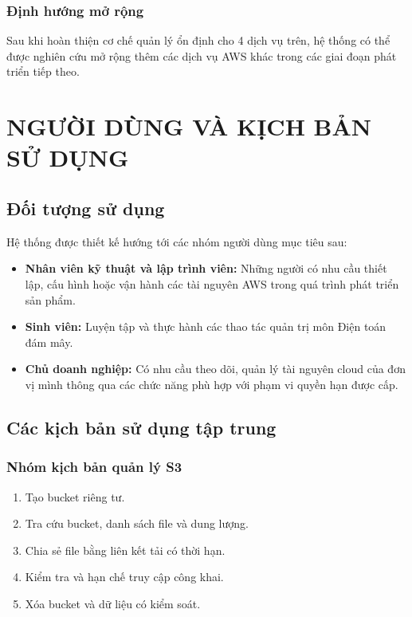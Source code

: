 \documentclass[a4paper,12pt]{article}
\begin{document}
\subsubsection{Định hướng mở rộng}
Sau khi hoàn thiện cơ chế quản lý ổn định cho 4 dịch vụ trên, hệ thống có thể được nghiên cứu mở rộng thêm các dịch vụ AWS khác trong các giai đoạn phát triển tiếp theo.


\section{NGƯỜI DÙNG VÀ KỊCH BẢN SỬ DỤNG}

\subsection{Đối tượng sử dụng}
Hệ thống được thiết kế hướng tới các nhóm người dùng mục tiêu sau:
\begin{itemize}
  \item \textbf{Nhân viên kỹ thuật và lập trình viên:} Những người có nhu cầu thiết lập, cấu hình hoặc vận hành các tài nguyên AWS trong quá trình phát triển sản phẩm.
  \item \textbf{Sinh viên:} Luyện tập và thực hành các thao tác quản trị môn Điện toán đám mây.
  \item \textbf{Chủ doanh nghiệp:} Có nhu cầu theo dõi, quản lý tài nguyên cloud của đơn vị mình thông qua các chức năng phù hợp với phạm vi quyền hạn được cấp.
\end{itemize}

\subsection{Các kịch bản sử dụng tập trung}

\subsubsection{Nhóm kịch bản quản lý S3}
\begin{enumerate}
  \item Tạo bucket riêng tư.
  \item Tra cứu bucket, danh sách file và dung lượng.
  \item Chia sẻ file bằng liên kết tải có thời hạn.
  \item Kiểm tra và hạn chế truy cập công khai.
  \item Xóa bucket và dữ liệu có kiểm soát.
\end{enumerate}
\end{document}
